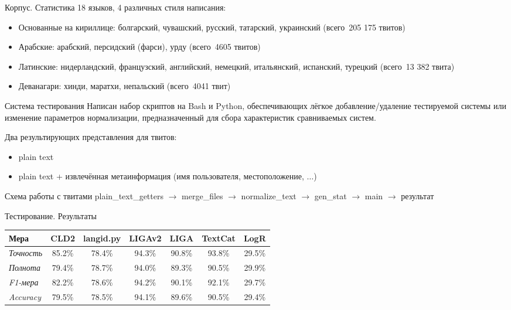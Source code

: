 \documentclass[mathserif,utf8,14pt]{beamer}
\begin{document}
\begin{frame}{Корпус. Статистика}
    18 языков, 4 различных стиля написания: 
    \begin{itemize}
        \item Основанные на кириллице: болгарский, чувашский, русский, татарский, украинский (всего~205 175 твитов)
        \item Арабские: арабский, персидский (фарси), урду (всего~4605 твитов)
        \item Латинские: нидерландский, французский, английский, немецкий, итальянский, испанский, турецкий 
            (всего~13 382 твита)
        \item Деванагари: хинди, маратхи, непальский (всего~4041 твит)
    \end{itemize}
\end{frame}

\begin{frame}{Система тестирования}
    Написан набор скриптов на Bash и Python, обеспечивающих лёгкое добавление/удаление тестируемой системы или
    изменение параметров нормализации, предназначенный для сбора характеристик сравниваемых систем. 

    Два результирующих представления для твитов: 
    \begin{itemize}
        \item plain text
        \item plain text + извлечённая метаинформация
    (имя пользователя, местоположение, $\ldots$)
    \end{itemize}
    \begin{block}{Схема работы с твитами}
        plain\_text\_getters $\to$ merge\_files $\to$ normalize\_text $\to$ gen\_stat $\to$ main 
        $\to$ {\color{blue}результат}
    \end{block}
\end{frame}

\begin{frame}{Тестирование. Результаты}

    \begin{center}
        \small
    \begin{table}[h]
    \begin{tabular*}{1.029\textwidth}{| l| *{6}{|c} |}
    \hline 
    Мера & CLD2 & langid.py & LIGAv2 & LIGA & TextCat  & LogR\\
    \hline
    \emph{Точность} & 85.2\% & 78.4\% & 94.3\% & 90.8\% & 93.8\% & 29.5\%\\
    \emph{Полнота} & 79.4\% & 78.7\% & 94.0\% & 89.3\% & 90.5\% & 29.9\%\\
    \emph{F1-мера} & 82.2\% & 78.6\% & {\color{blue}94.2\%} & 90.1\% & 92.1\% & {\color{red}29.7\%}\\
    \emph{Accuracy} & 79.5\% & 78.5\% & 94.1\% & 89.6\% & 90.5\% & 29.4\%\\
    \hline
    \end{tabular*}
    \end{table}
    \end{center}
\end{frame}
\end{document}
